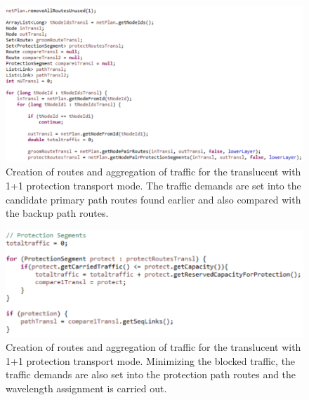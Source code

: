 \begin{figure}[H]
\centering
\includegraphics[width=17cm]{sdf/heuristic/translucent_protection/figures/grooming_translucent_protec3}
\caption{Creation of routes and aggregation of traffic for the translucent with 1+1 protection transport mode. The traffic demands are set into the candidate primary path routes found earlier and also compared with the backup path routes.}
\label{grooming_translucent_protec3}
\end{figure}

\begin{figure}[H]
\centering
\includegraphics[width=15cm]{sdf/heuristic/translucent_protection/figures/grooming_translucent_protec4}
\caption{Creation of routes and aggregation of traffic for the translucent with 1+1 protection transport mode. Minimizing the blocked traffic, the traffic demands are also set into the protection path routes and the wavelength assignment is carried out.}
\label{grooming_translucent_protec4}
\end{figure}

